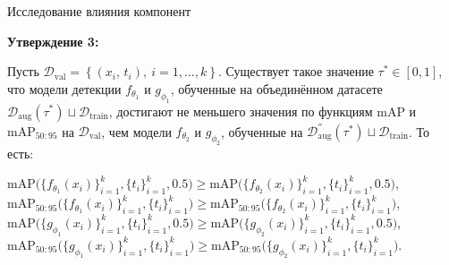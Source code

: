 \documentclass{beamer}
\begin{document}
\begin{frame}{Исследование влияния компонент}

\textbf{Утверждение 3:}\par

Пусть $\mathcal{D}_{\text{val}} =
\left\{
  (x_i,\,t_i), \
  i = 1,\dots,k
\right\}$. Существует такое значение $\tau^*\in[0,1]$, что модели детекции $f_{\theta_1}$ и $g_{\phi_1}$, обученные на объединённом датасете $\mathcal{D}_{\mathrm{aug}}(\tau^*)\sqcup\mathcal{D}_{\mathrm{train}}$, достигают не меньшего значения по функциям $\mathrm{mAP}$ и $\mathrm{mAP}_{50:95}$ на $\mathcal{D}_{\text{val}}$, чем модели $f_{\theta_2}$ и $g_{\phi_2}$, обученные на $\mathcal{D}^{''}_{\text{aug}}(\tau^{*}) \sqcup \mathcal{D}_{\text{train}}$. То есть:

\small{
\begin{center}
$\mathrm{mAP}\bigl(\{f_{\theta_1}(x_i)\}_{i=1}^k,\{t_i\}_{i=1}^k,0.5\bigr)\ge\mathrm{mAP}\bigl(\{f_{\theta_2}(x_i)\}_{i=1}^k,\{t_i\}_{i=1}^k,0.5\bigr)$,  
$\mathrm{mAP}_{50:95}\bigl(\{f_{\theta_1}(x_i)\}_{i=1}^k,\{t_i\}_{i=1}^k\bigr)\ge\mathrm{mAP}_{50:95}\bigl(\{f_{\theta_2}(x_i)\}_{i=1}^k,\{t_i\}_{i=1}^k\bigr)$,  
$\mathrm{mAP}\bigl(\{g_{\phi_1}(x_i)\}_{i=1}^k,\{t_i\}_{i=1}^k,0.5\bigr)\ge\mathrm{mAP}\bigl(\{g_{\phi_2}(x_i)\}_{i=1}^k,\{t_i\}_{i=1}^k,0.5\bigr)$,  
$\mathrm{mAP}_{50:95}\bigl(\{g_{\phi_1}(x_i)\}_{i=1}^k,\{t_i\}_{i=1}^k\bigr)\ge\mathrm{mAP}_{50:95}\bigl(\{g_{\phi_2}(x_i)\}_{i=1}^k,\{t_i\}_{i=1}^k\bigr)$.
\end{center}}

\end{frame}
\end{document}
